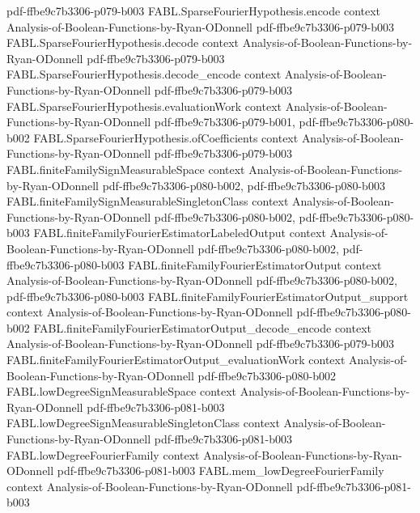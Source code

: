 \begin{theorem}
  {pdf-ffbe9c7b3306-p079-b003}
\proofstep
  {FABL.SparseFourierHypothesis.encode}
  {context}
  {Analysis-of-Boolean-Functions-by-Ryan-ODonnell}
  {pdf-ffbe9c7b3306-p079-b003}
\proofstep
  {FABL.SparseFourierHypothesis.decode}
  {context}
  {Analysis-of-Boolean-Functions-by-Ryan-ODonnell}
  {pdf-ffbe9c7b3306-p079-b003}
\proofstep
  {FABL.SparseFourierHypothesis.decode_encode}
  {context}
  {Analysis-of-Boolean-Functions-by-Ryan-ODonnell}
  {pdf-ffbe9c7b3306-p079-b003}
\proofstep
  {FABL.SparseFourierHypothesis.evaluationWork}
  {context}
  {Analysis-of-Boolean-Functions-by-Ryan-ODonnell}
  {pdf-ffbe9c7b3306-p079-b001,
    pdf-ffbe9c7b3306-p080-b002}
\proofstep
  {FABL.SparseFourierHypothesis.ofCoefficients}
  {context}
  {Analysis-of-Boolean-Functions-by-Ryan-ODonnell}
  {pdf-ffbe9c7b3306-p079-b003}
\proofstep
  {FABL.finiteFamilySignMeasurableSpace}
  {context}
  {Analysis-of-Boolean-Functions-by-Ryan-ODonnell}
  {pdf-ffbe9c7b3306-p080-b002,
    pdf-ffbe9c7b3306-p080-b003}
\proofstep
  {FABL.finiteFamilySignMeasurableSingletonClass}
  {context}
  {Analysis-of-Boolean-Functions-by-Ryan-ODonnell}
  {pdf-ffbe9c7b3306-p080-b002,
    pdf-ffbe9c7b3306-p080-b003}
\proofstep
  {FABL.finiteFamilyFourierEstimatorLabeledOutput}
  {context}
  {Analysis-of-Boolean-Functions-by-Ryan-ODonnell}
  {pdf-ffbe9c7b3306-p080-b002,
    pdf-ffbe9c7b3306-p080-b003}
\proofstep
  {FABL.finiteFamilyFourierEstimatorOutput}
  {context}
  {Analysis-of-Boolean-Functions-by-Ryan-ODonnell}
  {pdf-ffbe9c7b3306-p080-b002,
    pdf-ffbe9c7b3306-p080-b003}
\proofstep
  {FABL.finiteFamilyFourierEstimatorOutput_support}
  {context}
  {Analysis-of-Boolean-Functions-by-Ryan-ODonnell}
  {pdf-ffbe9c7b3306-p080-b002}
\proofstep
  {FABL.finiteFamilyFourierEstimatorOutput_decode_encode}
  {context}
  {Analysis-of-Boolean-Functions-by-Ryan-ODonnell}
  {pdf-ffbe9c7b3306-p079-b003}
\proofstep
  {FABL.finiteFamilyFourierEstimatorOutput_evaluationWork}
  {context}
  {Analysis-of-Boolean-Functions-by-Ryan-ODonnell}
  {pdf-ffbe9c7b3306-p080-b002}
\proofstep
  {FABL.lowDegreeSignMeasurableSpace}
  {context}
  {Analysis-of-Boolean-Functions-by-Ryan-ODonnell}
  {pdf-ffbe9c7b3306-p081-b003}
\proofstep
  {FABL.lowDegreeSignMeasurableSingletonClass}
  {context}
  {Analysis-of-Boolean-Functions-by-Ryan-ODonnell}
  {pdf-ffbe9c7b3306-p081-b003}
\proofstep
  {FABL.lowDegreeFourierFamily}
  {context}
  {Analysis-of-Boolean-Functions-by-Ryan-ODonnell}
  {pdf-ffbe9c7b3306-p081-b003}
\proofstep
  {FABL.mem_lowDegreeFourierFamily}
  {context}
  {Analysis-of-Boolean-Functions-by-Ryan-ODonnell}
  {pdf-ffbe9c7b3306-p081-b003}

\end{theorem}

